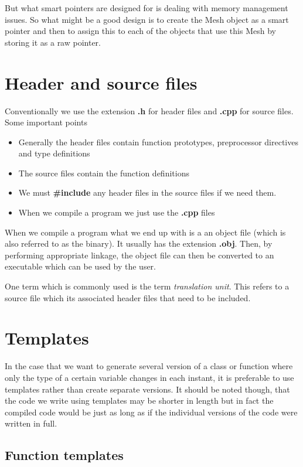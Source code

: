 But what smart pointers are designed for is dealing with memory
management issues. So what might be a good design is to create the
Mesh object as a smart pointer and then to assign this to each
of the objects that use this Mesh by storing it as a raw pointer.


\section{Header and source files}

Conventionally we use the extension {\bf .h} for header files and {\bf .cpp} for source files. Some important points
\begin{itemize}
\item Generally the header files contain function prototypes, preprocessor directives and type definitions
\item The source files contain the function definitions
\item We must {\bf \#include} any header files in the source files if we need them. 
\item When we compile a program we just use the {\bf .cpp} files 
\end{itemize}

When we compile a program what we end up with is a an object file (which is also referred to as the binary). It usually has the extension {\bf .obj}. Then, by performing appropriate linkage, the object file can then be converted to an executable which can be used by the user.

One term which is commonly used is the term \emph{translation unit}. This refers to a source file which its associated header files that need to be included.   

\section{Templates}

In the case that we want to generate several version of a class or function where only the type of a certain variable changes in each instant, it is preferable to use templates rather than create separate versions. It should be noted though, that the code we write using templates may be shorter in length but in fact the compiled code would be just as long as if the individual versions of the code were written in full. 

\subsection{Function templates}

